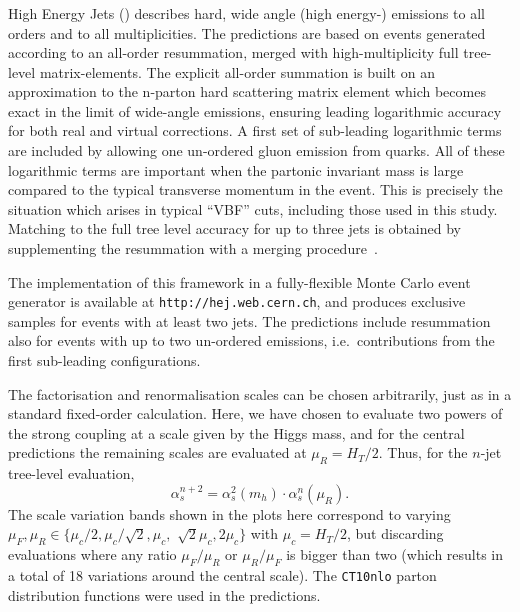 \subsubsection{\Hej}
\label{sec:hjetscomp:tools:bfkl:hej}

High Energy Jets (\Hej) describes hard, wide angle (high energy-)
emissions to all orders and to all multiplicities. The predictions are based
on events generated according to an all-order resummation, merged with
high-multiplicity full tree-level matrix-elements. The explicit all-order summation
is built on an approximation to the n-parton hard scattering matrix element
\cite{Andersen:2009nu,Andersen:2009he,Andersen:2011hs} which becomes exact in
the limit of wide-angle emissions, ensuring leading logarithmic accuracy for
both real and virtual corrections. A first set of sub-leading logarithmic
terms are included by allowing one un-ordered gluon emission from quarks. All
of these logarithmic terms are important when
the partonic invariant mass is large compared to the typical transverse
momentum in the event. This is precisely the situation which arises in
typical ``VBF'' cuts, including those used in this study.  Matching to the
full tree level accuracy for up to three jets is obtained by supplementing
the resummation with a merging
procedure~\cite{Andersen:2008ue,Andersen:2008gc}.

The implementation of this framework in a fully-flexible Monte Carlo event
generator is available at \texttt{http://hej.web.cern.ch}, and produces
exclusive samples for events with at least two jets.  The predictions include
resummation also for events with up to two un-ordered emissions,
i.e.~contributions from the first sub-leading configurations.

The factorisation and renormalisation scales can be chosen arbitrarily, just
as in a standard fixed-order calculation. Here, we have chosen to evaluate
two powers of the strong coupling at a scale given by the Higgs mass, and for
the central predictions the remaining scales are evaluated at $\mu_R=H_T/2$. Thus,
for the $n$-jet tree-level evaluation, 
\begin{equation}
  \alpha_s^{n+2}=\alpha^2_s(m_h)\cdot \alpha^n_s(\mu_R).
\end{equation}
The scale variation bands shown in the plots here correspond to varying
$\mu_F,\mu_R\in \{\mu_c/2, \mu_c/\sqrt{2}, \mu_c,$ $\sqrt{2}\mu_c, 2\mu_c\}$ with 
$\mu_c=H_T/2$, but discarding evaluations where any ratio $\mu_F/\mu_R$ or 
$\mu_R/\mu_F$ is bigger than two (which results in a total of 18 variations
around the central scale). The \texttt{CT10nlo} \cite{Lai:2010vv,Gao:2013xoa} parton 
distribution functions were used in the predictions.
